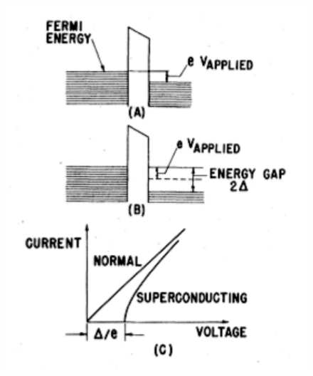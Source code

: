 \begin{frame}
\begin{columns}
\begin{column}{0.5\textwidth}
\begin{figure}[!h]
	\includegraphics[width=\textwidth]{fermi_levels2}
	\end{figure}
\end{column}
\end{columns}


\end{frame}
